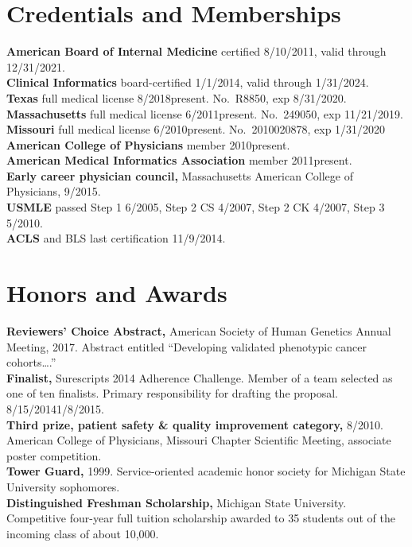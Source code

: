 \documentclass[10pt]{article}
\begin{document}
\section*{Credentials and Memberships}
\textbf{American Board of Internal Medicine} certified 8/10/2011,
valid through 12/31/2021.\\
\textbf{Clinical Informatics} board-certified 1/1/2014, valid through
1/31/2024.\\
\textbf{Texas} full medical license 8/2018\ndash{}present. No.\ R8850,
exp 8/31/2020.\\
\textbf{Massachusetts} full medical license 6/2011\ndash{}present.
No.\ 249050, exp 11/21/2019.\\
\textbf{Missouri} full medical license 6/2010\ndash{}present. No.\ 2010020878, exp 1/31/2020\\
\textbf{American College of Physicians} member 2010\ndash{}present.\\
\textbf{American Medical Informatics Association} member
2011\ndash{}present.\\
\textbf{Early career physician council,} Massachusetts American
College of Physicians, 9/\ndash{}2015.\\
\textbf{USMLE} passed Step 1 6/2005, Step 2 CS 4/2007, Step 2 CK
4/2007, Step 3 5/2010.\\
\textbf{ACLS} and BLS last certification 11/9/2014.

\section*{Honors and Awards}

\textbf{Reviewers' Choice Abstract,} American Society of Human
Genetics Annual Meeting, 2017. Abstract entitled ``Developing
validated phenotypic cancer cohorts\ldots{}.''\\
\textbf{Finalist,} Surescripts 2014 Adherence Challenge. Member of a
team selected as one of ten finalists. Primary responsibility for
drafting the proposal. 8/15/2014\ndash{}1/8/2015.\\
\textbf{Third prize, patient safety \& quality improvement category,}
8/2010. American College of Physicians, Missouri Chapter Scientific
Meeting, associate poster competition.\\
\textbf{Tower Guard,} 1999. Service-oriented academic honor
society for Michigan State University sophomores.\\
\textbf{Distinguished Freshman Scholarship,} Michigan State
University. Competitive four-year full tuition scholarship awarded to
35 students out of the incoming class of about 10,000.
\end{document}
